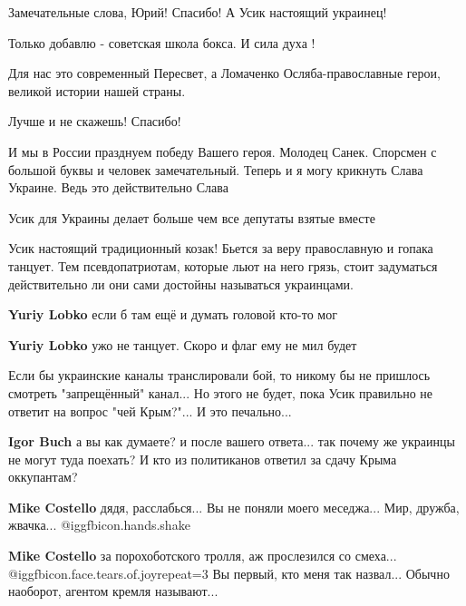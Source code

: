 \begin{itemize}
Замечательные слова, Юрий! Спасибо! А Усик настоящий украинец!


Только добавлю - советская школа бокса. И сила духа !

Для нас это современный Пересвет, а Ломаченко Осляба-православные герои, великой истории нашей страны.

Лучше и не скажешь! Спасибо!


И мы в России празднуем победу Вашего героя. Молодец Санек. Спорсмен с большой
буквы и человек замечательный. Теперь и я могу крикнуть Слава Украине. Ведь это
действительно Слава


Усик для Украины делает больше чем все депутаты взятые вместе


Усик настоящий традиционный козак! Бьется за веру православную и гопака
танцует. Тем псевдопатриотам, которые льют на него грязь, стоит задуматься
действительно ли они сами достойны называться украинцами.

\begin{itemize} %
\textbf{Yuriy Lobko} если б там ещё и думать головой кто-то мог

\textbf{Yuriy Lobko} ужо не танцует. Скоро и флаг ему не мил будет
\end{itemize} %


Если бы украинские каналы транслировали бой, то никому бы не пришлось смотреть "запрещённый" канал...
Но этого не будет, пока Усик правильно не ответит на вопрос "чей Крым?"... И это печально...

\begin{itemize} %
\textbf{Igor Buch} а вы как думаете? и после вашего ответа...
так почему же украинцы не могут туда поехать? И кто из политиканов ответил за сдачу Крыма оккупантам?

\textbf{Mike Costello} дядя, расслабься... Вы не поняли моего меседжа... Мир, дружба, жвачка...  @igg{fbicon.hands.shake} 

\textbf{Mike Costello} за порохоботского тролля, аж прослезился со смеха...  @igg{fbicon.face.tears.of.joy}{repeat=3}  Вы первый, кто меня так назвал... Обычно наоборот, агентом кремля называют...


\end{itemize}
\end{itemize}
